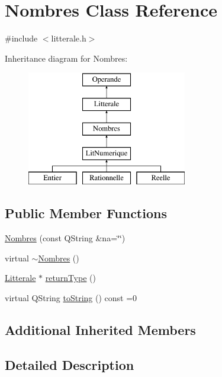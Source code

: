 \hypertarget{class_nombres}{}\section{Nombres Class Reference}
\label{class_nombres}


{\ttfamily \#include $<$litterale.\+h$>$}

Inheritance diagram for Nombres\+:\begin{figure}[H]
\begin{center}
\leavevmode
\includegraphics[height=5.000000cm]{class_nombres}
\end{center}
\end{figure}
\subsection*{Public Member Functions}
\begin{DoxyCompactItemize}
\item 
\hyperlink{class_nombres_aa704174b95cbac83fdb4f7ebef8c7e61}{Nombres} (const Q\+String \&na=\char`\"{}\char`\"{})
\item 
virtual \hyperlink{class_nombres_a3477192baa59691c68579251d40bdbcd}{$\sim$\+Nombres} ()
\item 
\hyperlink{class_litterale}{Litterale} $\ast$ \hyperlink{class_nombres_a82cf0b5a3182dcbfbedb75e81ac1e4f0}{return\+Type} ()
\item 
virtual Q\+String \hyperlink{class_nombres_a456e2e58403e79cabdfefb14fd19b4f1}{to\+String} () const  =0
\end{DoxyCompactItemize}
\subsection*{Additional Inherited Members}


\subsection{Detailed Description}


